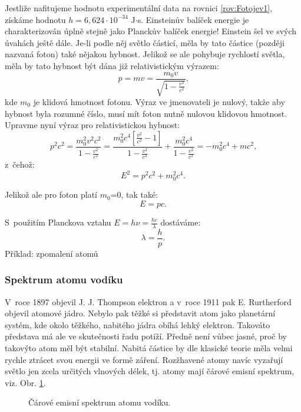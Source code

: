 Jestliže nafitujeme hodnotu  experimentální data na rovnici \ref{rov:Fotojev1}, získáme hodnotu $h= 6,624\cdot10^{-34}$ J$\cdot$s. Einsteinův balíček energie je charakterizován úplně stejně jako Planckův balíček energie! Einstein šel ve svých úvahách ještě dále. Je-li podle něj světlo částicí, měla by tato částice (později nazvaná foton) také nějakou hybnost. Jelikož se ale pohybuje rychlostí světla, měla by tato hybnost být dána již relativistickým výrazem:
\begin{equation}
p = mv = \frac{m_0 v}{\sqrt{1-\frac{v^2}{c^2}}}\mbox{,}
\label{rov:Fotojev2}
\end{equation}
kde $m_0$ je klidová hmotnost fotonu. Výraz ve jmenovateli je nulový, takže aby hybnost byla rozumné číslo, musí mít foton nutně nulovou klidovou hmotnost. Upravme nyní výraz pro relativistickou hybnost:
\begin{equation}
p^2c^2 = \frac{m_0^2v^2c^2}{1-\frac{v^2}{c^2}} = \frac{m_0^2 c^4 [\frac{v^2}{c^2}-1]}{1-\frac{v^2}{c^2}} + \frac{m_0^2 c^4}{1-\frac{v^2}{c^2}} = -m_0^2 c^4 + mc^2\mbox{,}
\label{Fotojev3}
\end{equation}
z~čehož:
\begin{equation}
E^2 = p^2c^2+ m_0^2c^4\mbox{.}
\label{Fotojev4}
\end{equation}

\noindent Jelikož ale pro foton platí $m_0$=0, tak také:
\begin{equation}
E=pc\mbox{.}
\label{rov:Fotojev5}
\end{equation}

\noindent S~použitím Planckova vztahu $E = h\nu = \frac{hc}{\lambda}$ dostáváme:
\begin{equation}
\lambda = \frac{h}{p}\mbox{.}
\label{rov:Fotojev6}
\end{equation}
Příklad:
zpomalení atomů
\vspace{2cm}

\subsubsection{Spektrum atomu vodíku}

V~roce 1897 objevil J. J. Thompson elektron a v~roce 1911 pak E. Rurtherford objevil atomové jádro. Nebylo pak těžké si představit atom jako planetární systém, kde okolo těžkého, nabitého jádra obíhá lehký elektron. Takováto představa má ale ve skutečnosti řadu potíží. Předně není vůbec jasné, proč by takovýto atom měl být stabilní. Nabitá částice by dle klasické teorie měla velmi rychle ztrácet svou energii ve formě záření. Rozžhavené atomy navíc vyzařují světlo jen zcela určitých vlnových délek, tj. atomy mají čárové emisní spektrum, viz. Obr. \ref{obr:spectrumH}. 
\begin{figure} [ht]
\centering
\caption[Komplexní rovina]{Čárové emisní spektrum atomu vodíku.}
\label{obr:spectrumH}
\end{figure}

